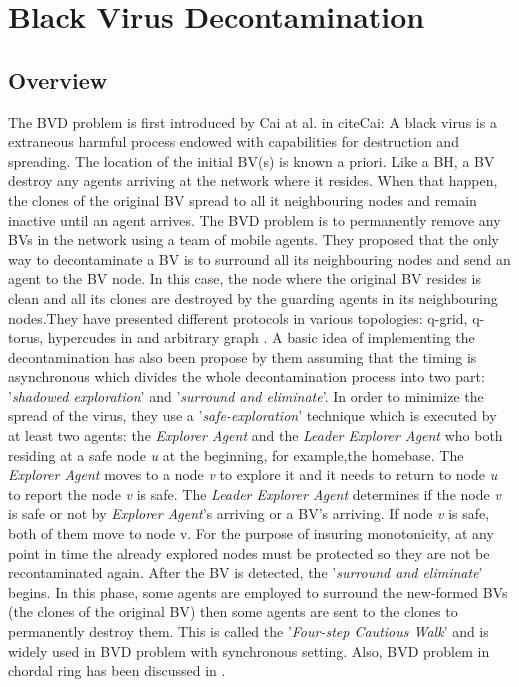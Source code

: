\section{Black Virus Decontamination}
\subsection{Overview}
The BVD problem is first introduced by Cai at al. in cite{Cai}: A black virus is a  extraneous harmful process endowed with capabilities for destruction and spreading. The location of the initial BV(s) is known a priori. Like a BH, a BV destroy any agents arriving at the network where it resides. When that happen, the clones of the original BV spread to all it neighbouring nodes and remain inactive until an agent arrives. The BVD problem is to permanently remove any BVs in the network using a team of mobile agents. They proposed that the only way to decontaminate a BV is to surround all its neighbouring nodes and send an agent to the BV node. In this case, the node where the original BV resides is clean and all its clones are destroyed by the guarding agents in its neighbouring nodes.They have presented different protocols in various topologies: q-grid, q-torus, hypercudes in \cite{Cai} and arbitrary graph \cite{Cai1}. A basic idea of implementing the decontamination has also been propose by them assuming that the timing is asynchronous which divides the whole decontamination process into two part: '{\em shadowed exploration}' and '{\em surround and eliminate}'. In order to minimize the spread of the virus, they use a '{\em safe-exploration}' technique which is executed by at least two agents: the {\em Explorer Agent} and the {\em Leader Explorer Agent} who both residing at a safe node {\em u} at the beginning, for example,the homebase. The {\em Explorer Agent} moves to a node {\em v} to explore it and it needs to return to node {\em u} to report the node {\em v} is safe. The {\em Leader Explorer Agent} determines if the node {\em v} is safe or not by {\em Explorer Agent}'s arriving or a BV's arriving. If node {\em v} is safe, both of them move to node v. For the purpose of insuring monotonicity, at any point in time the already explored nodes must be protected so they are not be recontaminated again. After the BV is detected, the '{\em surround and eliminate}' begins. In this phase, some agents are employed to surround the new-formed BVs (the clones of the original BV) then some agents are sent to the clones to permanently destroy them. This is called the '{\em Four-step Cautious Walk}' and is widely used in BVD problem with synchronous setting. Also, BVD problem in chordal ring has been discussed in
\cite{Alotaibi}.

